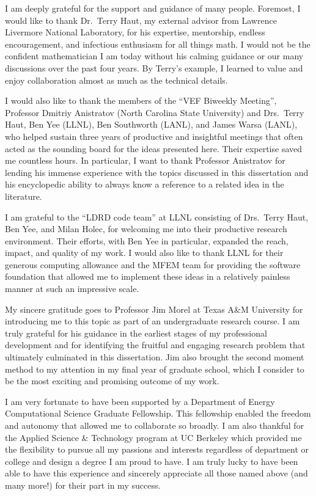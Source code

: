 \documentclass[../doc.tex]{subfiles}
\begin{document}
I am deeply grateful for the support and guidance of many people. 
Foremost, I would like to thank Dr.~Terry Haut, my external advisor from Lawrence Livermore National Laboratory, for his expertise, mentorship, endless encouragement, and infectious enthusiasm for all things math. I would not be the confident mathematician I am today without his calming guidance or our many discussions over the past four years. By Terry's example, I learned to value and enjoy collaboration almost as much as the technical details. 

I would also like to thank the members of the ``VEF Biweekly Meeting'', Professor Dmitriy Anistratov (North Carolina State University) and Drs.~Terry Haut, Ben Yee (LLNL), Ben Southworth (LANL), and James Warsa (LANL), who helped sustain three years of productive and insightful meetings that often acted as the sounding board for the ideas presented here. Their expertise saved me countless hours. In particular, I want to thank Professor Anistratov for lending his immense experience with the topics discussed in this dissertation and his encyclopedic ability to always know a reference to a related idea in the literature. 

I am grateful to the ``LDRD code team'' at LLNL consisting of Drs.~Terry Haut, Ben Yee, and Milan Holec, for welcoming me into their productive research environment. Their efforts, with Ben Yee in particular, expanded the reach, impact, and quality of my work. I would also like to thank LLNL for their generous computing allowance and the MFEM team for providing the software foundation that allowed me to implement these ideas in a relatively painless manner at such an impressive scale. 

My sincere gratitude goes to Professor Jim Morel at Texas A\&M University for introducing me to this topic as part of an undergraduate research course. 
I am truly grateful for his guidance in the earliest stages of my professional development and for identifying the fruitful and engaging research problem that ultimately culminated in this dissertation. 
Jim also brought the second moment method to my attention in my final year of graduate school, which I consider to be the most exciting and promising outcome of my work. 

I am very fortunate to have been supported by a Department of Energy Computational Science Graduate Fellowship. This fellowship enabled the freedom and autonomy that allowed me to collaborate so broadly. I am also thankful for the Applied Science \& Technology program at UC Berkeley which provided me the flexibility to pursue all my passions and interests regardless of department or college and design a degree I am proud to have. I am truly lucky to have been able to have this experience and sincerely appreciate all those named above (and many more!) for their part in my success. 

\end{document}
